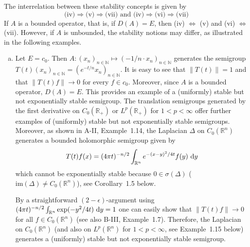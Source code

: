 The interrelation between these stability concepts is given by
\[
\text{(iv)} \Rightarrow \text{(v)} \Rightarrow \text{(vii)} \text{ and } \text{(iv)} \Rightarrow \text{(vi)} \Rightarrow \text{(vii)}
\]
If $A$ is a bounded operator, that is, if $D(A) = E$, then (iv) $\Leftrightarrow$ (v) and (vi) $\Leftrightarrow$ (vii).
However, if $A$ is unbounded, the stability notions may differ, as illustrated in the following examples.
\begin{example}\label{ex:a4-1.2}
\begin{enumerate}[(a), wide]
\item 
Let $E = c_{0}$. 
Then $A: (x_{n})_{n \in \mathbb{N}} \mapsto (-1/n \cdot x_{n})_{n \in \mathbb{N}}$ generates the semigroup $T(t)(x_{n})_{n \in \mathbb{N}} = (e^{-t/n} x_{n})_{n \in \mathbb{N}}$.
It is easy to see that $\|T(t)\|=1$ and that $\|T(t)f\|\to 0$ for every $f \in c_{0}$.
Moreover, since $A$ is a bounded operator, $D(A) = E$.
This provides an example of a (uniformly) stable but not exponentially stable semigroup.
The translation semigroups generated by the first derivative on $C_0(\mathbb{R}_{+})$ or $L^{p}(\mathbb{R}_{+})$ for $1 < p < \infty$ offer further examples of (uniformly) stable but not exponentially stable semigroups.
Moreover, as shown in A-II, Example~1.14, the Laplacian $\Delta$ on $C_0(\mathbb{R}^{n})$ generates a bounded holomorphic semigroup given by
\[
T(t)f(x) = (4\pi t)^{-n/2} \int_{\mathbb{R}^{n}} e^{-(x-y)^{2}/4t} f(y) \,\mathop{}\!\mathrm{d}{y}
\]
which cannot be exponentially stable because $0 \in \sigma(\Delta)$ ($\text{im}(\Delta) \not= C_0(\mathbb{R}^{n})$), see Corollary~1.5 below.

By a straightforward $(2-\epsilon)$-argument using $(4\pi t)^{-n/2}\int_{\mathbb{R}^{n}} \exp(-y^{2}/4t) \,\mathop{}\!\mathrm{d}{y} = 1$ one can easily show that $\|T(t)f\| \to 0$ for all $f \in C_0(\mathbb{R}^{n})$ (see also B-III, Example~1.7).
Therefore, the Laplacian on $C_0(\mathbb{R}^{n})$ (and also on $L^{p}(\mathbb{R}^{n})$ for $1 < p < \infty$, see Example~1.15 below) generates a (uniformly) stable but not exponentially stable semigroup.




\end{enumerate}
\end{example}
